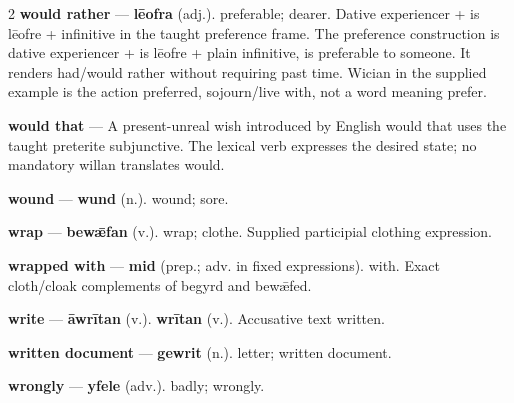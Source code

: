 \begin{multicols}{2}
\textbf{would rather} — \textbf{lēofra} (adj.). preferable; dearer. Dative experiencer + is lēofre + infinitive in the taught preference frame. The preference construction is dative experiencer + is lēofre + plain infinitive, is preferable to someone. It renders had/would rather without requiring past time. Wician in the supplied example is the action preferred, sojourn/live with, not a word meaning prefer.\par
\textbf{would that} — A present-unreal wish introduced by English would that uses the taught preterite subjunctive. The lexical verb expresses the desired state; no mandatory willan translates would.\par
\textbf{wound} — \textbf{wund} (n.). wound; sore.\par
\textbf{wrap} — \textbf{bewǣfan} (v.). wrap; clothe. Supplied participial clothing expression.\par
\textbf{wrapped with} — \textbf{mid} (prep.; adv. in fixed expressions). with. Exact cloth/cloak complements of begyrd and bewǣfed.\par
\textbf{write} — \textbf{āwrītan} (v.).  \textbf{wrītan} (v.). Accusative text written.\par
\textbf{written document} — \textbf{gewrit} (n.). letter; written document.\par
\textbf{wrongly} — \textbf{yfele} (adv.). badly; wrongly.\par

\end{multicols}

